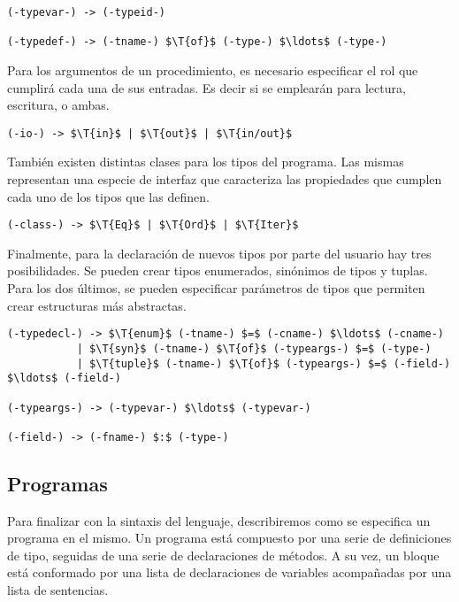 \documentclass{article}
\begin{document}
\begin{lstlisting}[style = syntax]
(-typevar-) -> (-typeid-)

(-typedef-) -> (-tname-) $\T{of}$ (-type-) $\ldots$ (-type-)
\end{lstlisting}

Para los argumentos de un procedimiento, es necesario especificar el rol que cumplirá cada una de sus entradas.
Es decir si se emplearán para lectura, escritura, o ambas.

\begin{lstlisting}[style = syntax]
(-io-) -> $\T{in}$ | $\T{out}$ | $\T{in/out}$
\end{lstlisting}

También existen distintas clases para los tipos del programa.
Las mismas representan una especie de interfaz que caracteriza las propiedades que cumplen cada uno de los tipos que las definen.

\begin{lstlisting}[style = syntax]
(-class-) -> $\T{Eq}$ | $\T{Ord}$ | $\T{Iter}$
\end{lstlisting}

Finalmente, para la declaración de nuevos tipos por parte del usuario hay tres posibilidades.
Se pueden crear tipos enumerados, sinónimos de tipos y tuplas.
Para los dos últimos, se pueden especificar parámetros de tipos que permiten crear estructuras más abstractas.

\begin{lstlisting}[style = syntax]
(-typedecl-) -> $\T{enum}$ (-tname-) $=$ (-cname-) $\ldots$ (-cname-)
           | $\T{syn}$ (-tname-) $\T{of}$ (-typeargs-) $=$ (-type-)
           | $\T{tuple}$ (-tname-) $\T{of}$ (-typeargs-) $=$ (-field-) $\ldots$ (-field-)

(-typeargs-) -> (-typevar-) $\ldots$ (-typevar-)

(-field-) -> (-fname-) $:$ (-type-)
\end{lstlisting}

\subsection{Programas}

Para finalizar con la sintaxis del lenguaje, describiremos como se especifica un programa en el mismo.
Un programa está compuesto por una serie de definiciones de tipo, seguidas de una serie de declaraciones de métodos.
A su vez, un bloque está conformado por una lista de declaraciones de variables acompañadas por una lista de sentencias.
\end{document}

